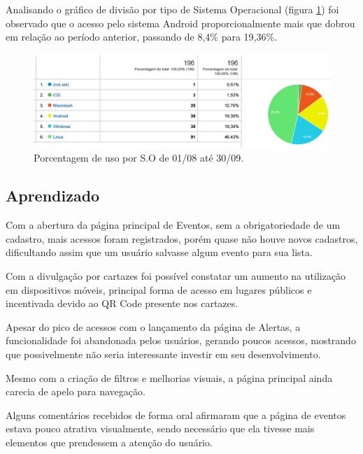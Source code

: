 \par Analisando o gráfico de divisão por tipo de Sistema Operacional (figura \ref{fig:analytics_2ainteracao_so}) foi observado que o acesso pelo sistema Android proporcionalmente mais que dobrou em relação ao período anterior, passando de 8,4\% para 19,36\%.

\begin{figure}[htb]
\centering
\includegraphics[width=15cm]{figuras/analytics_2ainteracao_so}
\caption{\label{fig:analytics_2ainteracao_so} Porcentagem de uso por S.O de 01/08 até 30/09.}
\end{figure}

\subsection{Aprendizado}

\par Com a abertura da página principal de Eventos, sem a obrigatoriedade de um cadastro, mais acessos foram registrados, porém quase não houve novos cadastros, dificultando assim que um usuário salvasse algum evento para sua lista.

\par Com a divulgação por cartazes foi possível constatar um aumento na utilização em dispositivos móveis, principal forma de acesso em lugares públicos e incentivada devido ao QR Code presente nos cartazes.

\par Apesar do pico de acessos com o lançamento da página de Alertas, a funcionalidade foi abandonada pelos usuários, gerando poucos acessos, mostrando que possivelmente não seria interessante investir em seu desenvolvimento.

\par Mesmo com a criação de filtros e melhorias visuais, a página principal ainda carecia de apelo para navegação.
\par Alguns comentários recebidos de forma oral afirmaram que a página de eventos estava pouco atrativa visualmente, sendo necessário que ela tivesse mais elementos que prendessem a atenção do usuário.

